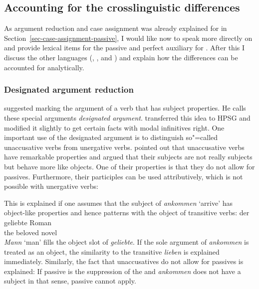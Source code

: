 




\subsection{Accounting for the crosslinguistic differences}

As argument reduction and case assignment was already explained for  in
Section~\ref{sec-case-assignment-passive}, I would like now to speak more directly on and provide 
lexical items for the passive and perfect auxiliary for . After this I discuss the other
languages (\eg {}, , and ) and explain how the differences can be accounted for analytically.

\subsubsection{Designated argument reduction}

\largerpage
\citet[]{Haider86} suggested marking the argument of a verb that has subject properties. He calls
these special arguments \emph{designated argument}. \citet{HM94a} transferred this idea to HPSG and
\citet{Mueller2003e} modified it slightly to get certain facts with modal infinitives
right. One important use of the designated argument is to distinguish so"=called
unaccusative verbs from unergative verbs. \citet{Perlmutter78} pointed out that unaccusative verbs
have remarkable properties and argued that their subjects are not really subjects but behave more
like objects. One of their properties is that they do not allow for passives. Furthermore, their
participles can be used attributively, which is not possible with unergative verbs:

\eal
{}
\zl

\noindent
This is explained if one assumes that the subject of \emph{ankommen} `arrive' has object-like
properties and hence patterns with the object of transitive verbs:
\ea
\gll der geliebte Roman\\
     the beloved  novel\\
\z
\emph{Mann} `man' fills the object slot of \emph{geliebte}. If the sole argument of \emph{ankommen}
is treated as an object, the similarity to the transitive \emph{lieben} is explained
immediately. Similarly, the fact that unaccusatives do not allow for passives is explained: If
passive is the suppression of the  and \emph{ankommen} does not have a subject in that sense,
passive cannot apply.

